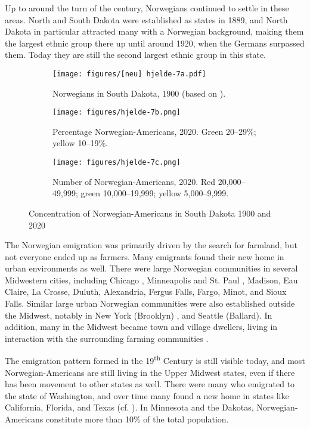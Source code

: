 \documentclass[output=paper]{langscibook}
\begin{document}
Up to around the turn of the century, Norwegians continued to settle in these areas. North and South Dakota were established as states in 1889, and North Dakota in particular attracted many with a Norwegian background, making them the largest ethnic group there up until around 1920, when the Germans surpassed them. Today they are still the second largest ethnic group in this state.


\begin{figure}
\begin{subfigure}[t]{.3\textwidth}
\texttt{[image: figures/[neu] hjelde-7a.pdf]} 
\caption{Norwegians in South Dakota, 1900 (based on \citealt{Qualey1938}).}\label{fig:hjelde:7a}
\end{subfigure}\hfill
\begin{subfigure}[t]{.3\textwidth}
\texttt{[image: figures/hjelde-7b.png]} 
\caption{Percentage Norwegian\hyp Americans, 2020. Green 20--29\%; yellow 10--19\%.}\label{fig:hjelde:7b}
\end{subfigure}\hfill
\begin{subfigure}[t]{.3\textwidth}
\texttt{[image: figures/hjelde-7c.png]} 
\caption{Number of Norwegian\hyp Americans, 2020. Red 20,000--49,999; green 10,000--19,999; yellow 5,000--9,999.}\label{fig:hjelde:7c}
\end{subfigure}%
\caption{Concentration of Norwegian-Americans in South Dakota 1900 and 2020}
\end{figure}

The Norwegian emigration was primarily driven by the search for farmland, but not everyone ended up as farmers. Many emigrants found their new home in urban environments as well. There were large Norwegian communities in several Midwestern cities, including Chicago \citep{Lovoll1988}, Minneapolis and St. Paul \citep{Mauk2022}, Madison, Eau Claire, La Crosse, Duluth, Alexandria, Fergus Falls, Fargo, Minot, and Sioux Falls. Similar large urban Norwegian communities were also established outside the Midwest, notably in New York (Brooklyn) \citep{Mauk1997}, and Seattle (Ballard). In addition, many in the Midwest became town and village dwellers, living in interaction with the surrounding farming communities \citep{Lovoll2006}.

The emigration pattern formed in the 19\textsuperscript{th} Century is still visible today, and most Norwegian\hyp Americans are still living in the Upper Midwest states, even if there has been movement to other states as well. There were many who emigrated to the state of Washington, and over time many found a new home in states like California, Florida, and Texas (cf. ). In Minnesota and the Dakotas, Norwegian\hyp Americans constitute more than 10\% of the total population.
\end{document}
